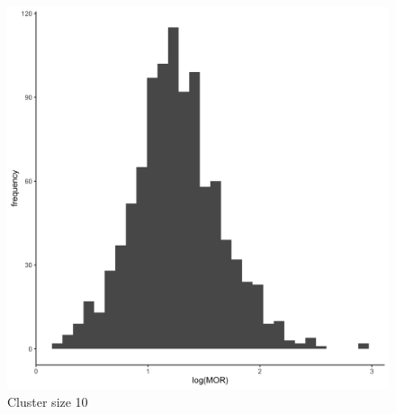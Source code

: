 \documentclass[
  letterpaper,
  DIV=11,
  numbers=noendperiod,
  titlepage]{scrartcl}
\begin{document}
\begin{figure}
\begin{minipage}[t]{0.24\linewidth}
{{\includegraphics{../../plots/two-lvl-ran-slope/high-prev/hist_50_10_two_lvl_slp_high_prev_q1.png}

}

\caption{Cluster size 10}

}

\end{minipage}%
%
\begin{minipage}[t]{0.24\linewidth}

{\centering 

}
\end{minipage}
\end{figure}
\end{document}
